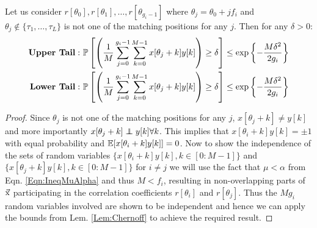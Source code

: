\begin{lemma}
	\label{Lem:tailbounds}
Let us consider $r[\theta_0],r[\theta_1],\ldots ,r[\theta_{g_i-1}]$ where $\theta_j=\theta_0+jf_i$ and $\theta_j \notin \{\tau_1,\ldots, \tau_L\}$ is not one of the matching positions for any $j$. Then for any $\delta>0$:
\begin{align*}
\text{\textbf{Upper Tail}}: ~&\mathbb{P}\left[ \left(\frac{1}{M}\sum\limits_{j=0}^{g_i-1}\sum\limits_{k=0}^{M-1}x[\theta_j+k]y[k]\right)\geq \delta\right]\leq \exp\left\lbrace-\frac{M\delta^2}{2g_i}\right\rbrace\\
\text{\textbf{Lower Tail}}: ~&\mathbb{P}\left[ \left(\frac{1}{M}\sum\limits_{j=0}^{g_i-1}\sum\limits_{k=0}^{M-1}x[\theta_j+k]y[k]\right)\geq \delta\right]\leq \exp\left\lbrace-\frac{M\delta^2}{2g_i}\right\rbrace\\
\end{align*}
\end{lemma}
\begin{proof}
Since $\theta_j$ is not one of the matching positions for any $j$, $x[\theta_j+k]\neq y[k]$ and more importantly $x[\theta_j+k]\indep y[k] \forall k$. This implies that $x[\theta_i+k]y[k]=\pm 1$ with equal probability and $\mathbb{E}[x[\theta_i+k]y[k]]=0$. Now to show the independence of the sets of random variables $\{x[\theta_i+k]y[k],k\in[0:M-1]\}$ and $\{x[\theta_j+k]y[k],k\in[0:M-1]\}$ for $i\neq j$ we will use the fact that $\mu<\alpha$  from Eqn. \eqref{Eqn:IneqMuAlpha} and thus $M<f_i$, resulting in non-overlapping parts of $\vec{\mathrm{x}}$  participating in the correlation coefficients $r[\theta_i]$ and $r[\theta_j]$. Thus the $Mg_i$ random variables involved are shown to be independent and hence we can apply the bounds from Lem. \ref{Lem:Chernoff} to achieve the required result.
\end{proof}


